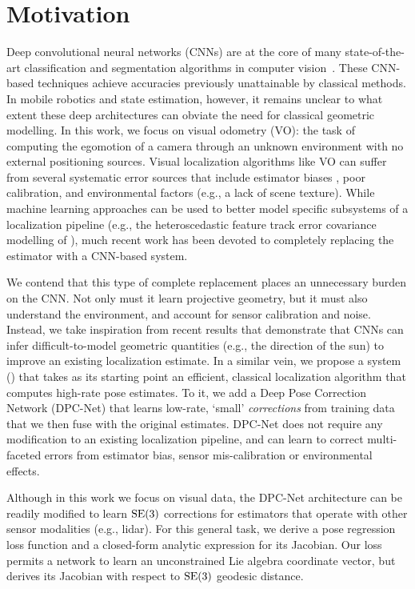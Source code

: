 \section{Motivation}
Deep convolutional neural networks (CNNs) are at the core of many state-of-the-art classification and segmentation algorithms in computer vision~\citep{LeCun2015-qf}. 
These CNN-based techniques achieve accuracies previously
unattainable by classical methods. In mobile robotics and state estimation, however, it remains unclear to what extent these deep architectures can obviate the need for classical geometric modelling. 
In this work, we focus on visual odometry (VO): the task of computing the egomotion of a camera through an unknown environment with no external positioning sources. Visual localization algorithms like VO can suffer from several systematic error sources
that include estimator biases \citep{Peretroukhin2014-db}, poor calibration, and environmental factors (e.g., a lack of scene texture). While machine learning approaches can be used to better model specific subsystems of a localization pipeline (e.g., the heteroscedastic feature track error covariance modelling of \citep{Peretroukhin2016-om, 2015_Peretroukhin_PROBE}), much recent work \citep{Costante2016-hb, Clark2017-zg, Kendall2017-u, Melekhov2017-dl, Oliveira2017-lt} has been devoted to completely replacing the estimator with a CNN-based system.



We contend that this type of complete replacement places an unnecessary burden on the CNN. Not only must it learn projective geometry, but it must also understand the environment, and account for sensor calibration and noise.  Instead, we take inspiration from recent results \citep{2017_Peretroukhin_Reducing} that demonstrate that CNNs can infer difficult-to-model geometric quantities (e.g., the direction of the sun) to improve an existing localization estimate.  
In a similar vein, we propose a system () that takes as its starting point an efficient, classical localization algorithm that computes high-rate pose estimates. To it, we add a Deep Pose Correction Network (DPC-Net) that learns low-rate, `small' \textit{corrections} from training data that we then fuse with the original estimates. DPC-Net does not require any modification to an existing localization pipeline, and can learn to correct multi-faceted errors from estimator bias, sensor mis-calibration or environmental effects.  

Although in this work we focus on visual data, the DPC-Net architecture can be readily modified to learn $\mathrm{SE}(3)$ corrections for estimators that operate with other sensor modalities (e.g., lidar). For this general task, we derive a pose regression loss function and a closed-form analytic expression for its Jacobian. Our loss permits a network to learn an unconstrained Lie algebra coordinate vector, but derives its Jacobian with respect to $\mathrm{SE}(3)$ geodesic distance. 




